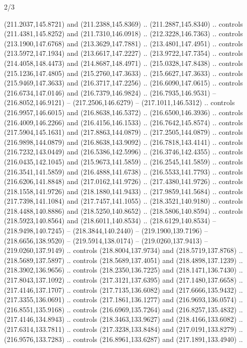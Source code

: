 \begin{flagdescription}{2/3}
\begin{scope}[xshift=0.5\flaglength,yshift=0.5\flagwidth,scale=\flagwidth/180]
\begin{scope}[y=0.8pt, x=0.8pt, yscale=-1,shift={(-168.75,-108.75)}]
  (211.2037,145.8721) and (211.2388,145.8369) .. (211.2887,145.8340) .. controls
  (211.4381,145.8252) and (211.7310,146.0918) .. (212.3228,146.7363) .. controls
  (213.1900,147.6768) and (213.3629,147.7881) .. (213.4801,147.4951) .. controls
  (213.5972,147.1934) and (213.6617,147.2227) .. (213.9722,147.7354) .. controls
  (214.4058,148.4473) and (214.8687,148.4971) .. (215.0328,147.8438) .. controls
  (215.1236,147.4805) and (215.2760,147.3633) .. (215.6627,147.3633) .. controls
  (215.9469,147.3633) and (216.3717,147.2256) .. (216.6090,147.0615) .. controls
  (216.6734,147.0146) and (216.7379,146.9824) .. (216.7935,146.9531) --
  (216.8052,146.9121) -- (217.2506,146.6279) -- (217.1011,146.5312) .. controls
  (216.9957,146.6015) and (216.8638,146.5372) .. (216.6500,146.3936) .. controls
  (216.4009,146.2266) and (216.4156,146.1533) .. (216.7642,145.8574) .. controls
  (217.5904,145.1631) and (217.8863,144.0879) .. (217.2505,144.0879) .. controls
  (216.9898,144.0879) and (216.8638,143.9092) .. (216.7818,143.4141) .. controls
  (216.7232,143.0449) and (216.5386,142.5996) .. (216.3746,142.4355) .. controls
  (216.0435,142.1045) and (215.9673,141.5859) .. (216.2545,141.5859) .. controls
  (216.3541,141.5859) and (216.4888,141.6738) .. (216.5533,141.7793) .. controls
  (216.6206,141.8848) and (217.0162,141.9726) .. (217.4380,141.9726) .. controls
  (218.1558,141.9726) and (218.1880,141.9433) .. (217.9859,141.5684) .. controls
  (217.7398,141.1084) and (217.7457,141.1055) .. (218.3521,140.9180) .. controls
  (218.4488,140.8886) and (218.5250,140.8652) .. (218.5806,140.8594) .. controls
  (218.5923,140.8564) and (218.6011,140.8534) .. (218.6129,140.8534) --
  (218.9498,140.7245) -- (218.3844,140.2440) -- (219.1900,139.7196) --
  (218.6656,138.9520) -- (219.5914,138.0174) -- (219.0260,137.9413) --
  (219.0260,137.9149) .. controls (218.8004,137.9734) and (218.5719,137.8768) ..
  (218.5689,137.5897) .. controls (218.5689,137.4051) and (218.4898,137.1239) ..
  (218.3902,136.9656) .. controls (218.2350,136.7225) and (218.1471,136.7430) ..
  (217.8043,137.1092) .. controls (217.3121,137.6395) and (217.1480,137.6658) ..
  (217.4146,137.1707) .. controls (217.7135,136.6082) and (217.6666,135.9432) ..
  (217.3355,136.0691) .. controls (217.1861,136.1277) and (216.9693,136.0574) ..
  (216.8551,135.9168) .. controls (216.6969,135.7264) and (216.8257,135.4832) ..
  (217.4146,134.8943) .. controls (218.3463,133.9627) and (218.4166,133.6082) ..
  (217.6314,133.7811) .. controls (217.3238,133.8484) and (217.0191,133.8279) ..
  (216.9576,133.7283) .. controls (216.8961,133.6287) and (217.1891,133.4940) ..

\end{scope}
\end{scope}
\end{flagdescription}

